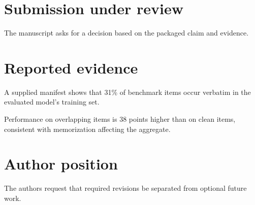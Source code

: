 \documentclass{article}
\begin{document}
\section{Submission under review}
The manuscript asks for a decision based on the packaged claim and evidence.
\section{Reported evidence}
A supplied manifest shows that 31\% of benchmark items occur verbatim in the evaluated model's training set.

Performance on overlapping items is 38 points higher than on clean items, consistent with memorization affecting the aggregate.
\section{Author position}
The authors request that required revisions be separated from optional future work.
\end{document}
